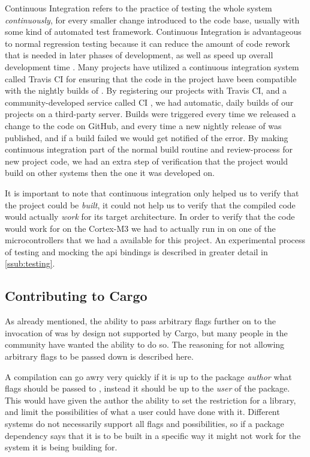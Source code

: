Continuous Integration refers to the practice of testing the whole system \emph{continuously}, for every smaller change introduced to the code base, usually with some kind of automated test framework.
Continuous Integration is advantageous to normal regression testing because it can reduce the amount of code rework that is needed in later phases of development, as well as speed up overall development time  \cite{Orso2014}.
Many {\rust} projects have utilized a continuous integration system called Travis CI \cite{web:travis_ci} for ensuring that the code in the project have been compatible with the nightly builds of {\rust}.
By registering our projects with Travis CI, and a community-developed service called {\rust} CI \cite{web:rust_ci}, we had automatic, daily builds of our projects on a third-party server.
Builds were triggered every time we released a change to the code on GitHub, and every time a new nightly release of {\rust} was published, and if a build failed we would get notified of the error.
By making continuous integration part of the normal build routine and review-process for new project code, we had an extra step of verification that the project would build on other systems then the one it was developed on.

It is important to note that continuous integration only helped us to verify that the project could be \emph{built}, it could not help us to verify that the compiled code would actually \emph{work} for its target architecture.
In order to verify that the code would work for on the Cortex-M3 we had to actually run in on one of the microcontrollers that we had a available for this project.
An experimental process of testing and mocking the {\emlib} \gls{api} bindings is described in greater detail in \autoref{ssub:testing}.

\subsection{Contributing to Cargo}
\label{ssub:contributing_to_cargo}

As already mentioned, the ability to pass arbitrary flags further on to the invocation of {\rustc} was by design not supported by Cargo, but many people in the {\rust} community have wanted the ability to do so.
The reasoning for not allowing arbitrary flags to be passed down is described here.

A compilation can go awry very quickly if it is up to the package \emph{author} what flags should be passed to {\rustc}, instead it should be up to the \emph{user} of the package.
This would have given the author the ability to set the restriction for a library, and limit the possibilities of what a user could have done with it.
Different systems do not necessarily support all flags and possibilities, so if a package dependency says that it is to be built in a specific way it might not work for the system it is being building for.

